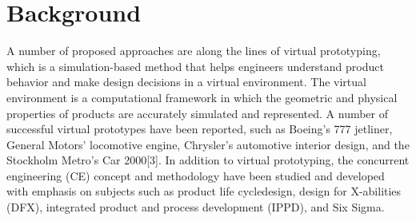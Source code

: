 \section{Background}

A number of proposed approaches are along the lines of virtual prototyping,  which 
is  a  simulation-based  method  that  helps  engineers 
understand product behavior and make design decisions in a virtual environment. 
The virtual environment is a computational framework in which the geometric and 
physical properties of products are accurately simulated and represented. A number
of successful virtual prototypes have  been  reported, such as  Boeing’s 777 jetliner,  
General Motors’ locomotive engine, Chrysler’s automotive interior design, 
and the Stockholm Metro’s Car 2000[3]. In addition to virtual prototyping, 
the concurrent engineering (CE) concept and methodology have been studied 
and developed with emphasis on subjects such as product life cycledesign, 
design for X-abilities (DFX), integrated product and process development (IPPD), and Six Sigma.
